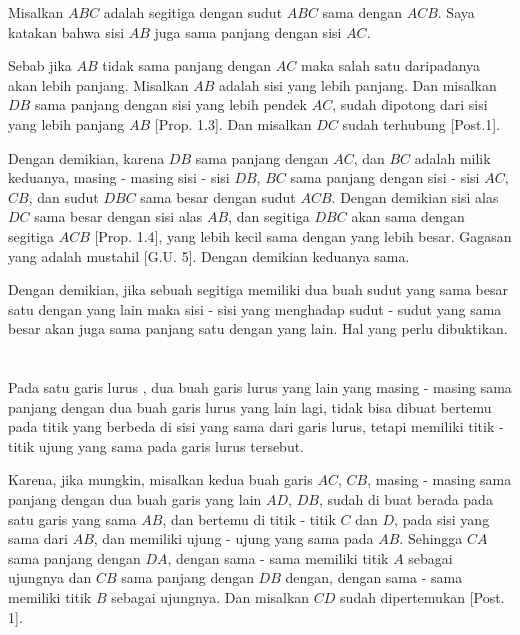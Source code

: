 \documentclass[a4paper]{book}
\begin{document}
Misalkan $ABC$ adalah segitiga dengan sudut $ABC$ sama dengan $ACB$. Saya 
katakan bahwa sisi $AB$ juga sama panjang dengan sisi $AC$.

Sebab jika $AB$ tidak sama panjang dengan $AC$ maka salah satu daripadanya
akan lebih panjang. Misalkan $AB$ adalah sisi yang lebih panjang. Dan 
misalkan $DB$ sama panjang dengan sisi yang lebih pendek $AC$, sudah dipotong
dari sisi yang lebih panjang $AB$ [Prop. 1.3]. Dan misalkan $DC$ sudah
terhubung [Post.1].

Dengan demikian, karena $DB$ sama panjang dengan $AC$, dan $BC$ adalah milik
keduanya, masing - masing sisi - sisi $DB$, $BC$ sama panjang dengan sisi - sisi
$AC$, $CB$, dan sudut $DBC$ sama besar dengan sudut $ACB$.
Dengan demikian sisi alas $DC$ sama besar dengan sisi alas $AB$, dan segitiga
$DBC$ akan sama dengan segitiga $ACB$ [Prop. 1.4], yang lebih kecil sama
dengan yang lebih besar. Gagasan yang adalah mustahil [G.U. 5].
Dengan demikian keduanya sama.

Dengan demikian, jika sebuah segitiga memiliki dua buah sudut yang sama besar
satu dengan yang lain maka sisi - sisi yang menghadap sudut - sudut yang sama
besar akan juga sama panjang satu dengan yang lain. Hal yang perlu dibuktikan.

\section*{\centering \thesection} 
Pada satu garis lurus , dua buah garis lurus yang lain yang masing - masing 
sama panjang dengan dua buah garis lurus yang lain lagi, tidak bisa dibuat 
bertemu pada titik yang berbeda di sisi yang sama dari garis lurus, tetapi
memiliki titik - titik ujung yang sama pada garis lurus tersebut.
\begin{center}
\end{center}
Karena, jika mungkin, misalkan kedua buah garis $AC$, $CB$, masing - masing 
sama panjang dengan dua buah garis yang lain $AD$, $DB$, sudah di buat berada
pada satu garis yang sama $AB$, dan bertemu di titik - titik $C$ dan $D$, pada
sisi yang sama dari $AB$, dan memiliki ujung - ujung yang sama pada $AB$. 
Sehingga $CA$ sama panjang dengan $DA$, dengan sama - sama memiliki titik $A$ 
sebagai ujungnya dan $CB$ sama panjang dengan $DB$ dengan, dengan sama - sama
memiliki titik $B$ sebagai ujungnya. Dan misalkan $CD$ sudah dipertemukan 
[Post. 1].  
\end{document}

